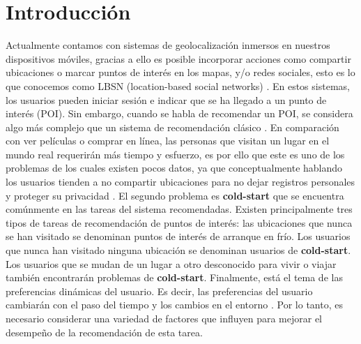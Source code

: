 \documentclass[sigplan,screen]{acmart}
\begin{document}
\section{Introducción}
Actualmente contamos con sistemas de geolocalización inmersos en nuestros dispositivos móviles, gracias a ello es posible incorporar acciones como compartir ubicaciones o marcar puntos de interés en los mapas, y/o redes sociales, esto es lo que conocemos como LBSN (location-based social networks) \cite{qian2018time}. En estos sistemas, los usuarios pueden iniciar sesión e indicar que se ha llegado a un punto de interés (POI). 
Sin embargo, cuando se habla de recomendar un POI, se considera algo más complejo que un sistema de recomendación clásico \cite{si2019adaptive}. En comparación con ver películas o comprar en línea, las personas que visitan un lugar en el mundo real requerirán más tiempo y esfuerzo, es por ello que este es uno de los problemas de los cuales existen pocos datos, ya que conceptualmente hablando los usuarios tienden a no compartir ubicaciones para no dejar registros personales y proteger su privacidad \cite{xiong2020go}. El segundo problema es \textbf{cold-start} que se encuentra comúnmente en las tareas del sistema recomendadas. Existen principalmente tres tipos de tareas de recomendación de puntos de interés: las ubicaciones que nunca se han visitado se denominan puntos de interés de arranque en frío. Los usuarios que nunca han visitado ninguna ubicación se denominan usuarios de \textbf{cold-start}. Los usuarios que se mudan de un lugar a otro desconocido para vivir o viajar también encontrarán problemas de \textbf{cold-start}\cite{qian2019spatiotemporal}. Finalmente, está el tema de las preferencias dinámicas del usuario. Es decir, las preferencias del usuario cambiarán con el paso del tiempo y los cambios en el entorno \cite{xing2018points}. Por lo tanto, es necesario considerar una variedad de factores que influyen para mejorar el desempeño de la recomendación de esta tarea.
\end{document}

